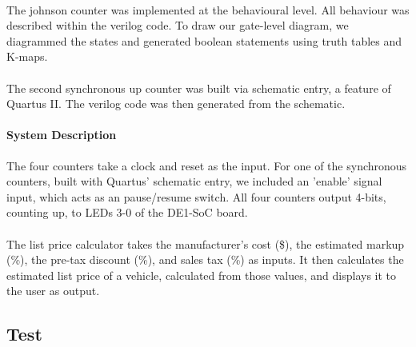 \documentclass{article}
\begin{document}

  \paragraph{}The johnson counter was implemented at the behavioural level. All behaviour was described within the verilog code. To draw our gate-level diagram, we diagrammed the states and generated boolean statements using truth tables and K-maps.


  \paragraph{}The second synchronous up counter was built via schematic entry, a feature of Quartus II. The verilog code was then generated from the schematic.

  \paragraph{System Description} The four counters take a clock and reset as the input. For one of the synchronous counters, built with Quartus' schematic entry, we included an 'enable' signal input, which acts as an pause/resume switch. All four counters output 4-bits, counting up, to LEDs 3-0 of the DE1-SoC board.

  \paragraph{} The list price calculator takes the manufacturer's cost (\$), the estimated markup (\%), the pre-tax discount (\%), and sales tax (\%) as inputs. It then calculates the estimated list price of a vehicle, calculated from those values, and displays it to the user as output.

  \subsection{Test}
\end{document}

